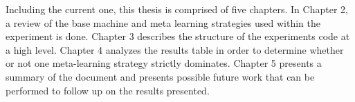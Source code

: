 Including the current one, this thesis is comprised of five chapters. In
Chapter 2, a review of the base machine and meta learning strategies used
within the experiment is done. Chapter 3 describes the structure of the
experiments code at a high level. Chapter 4 analyzes the results table in
order to determine whether or not one meta-learning strategy strictly dominates.
Chapter 5 presents a summary of the document and presents possible future work
that can be performed to follow up on the results presented.

\pagebreak
